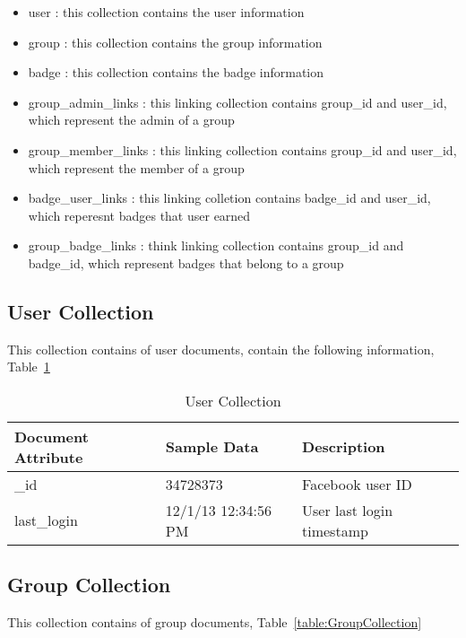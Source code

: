 \begin{itemize}
\item user : this collection contains the user information
\item group : this collection contains the group information  
\item badge : this collection contains the badge information
\item group{\_}admin{\_}links : this linking collection contains group{\_}id and user{\_}id, which represent the admin of a group
\item group{\_}member{\_}links : this linking collection contains group{\_}id and user{\_}id, which represent the member of a group
\item badge{\_}user{\_}links : this linking colletion contains badge{\_}id and user{\_}id, which reperesnt badges that user earned
\item group{\_}badge{\_}links : think linking collection contains group{\_}id and badge{\_}id, which represent badges that belong to a group
\end{itemize}

\subsection{User Collection}
This collection contains of user documents, contain the following information, Table~\ref{table:UserCollection}

\begin{table}[H]
\caption{User Collection}
\label{table:UserCollection}
\textbf{ }
\begin{center}
\begin{tabular}{ | l | l |  l | }
\hline
Document Attribute & Sample Data & Description \\ \hline
{\_}id & 34728373 & Facebook user ID \\ \hline
last{\_}login & 12/1/13 12:34:56 PM & User last login timestamp   \\ \hline
\end{tabular}
\end{center}
\end{table}

\subsection{Group Collection}
This collection contains of group documents,  Table~\ref{table:GroupCollection}


